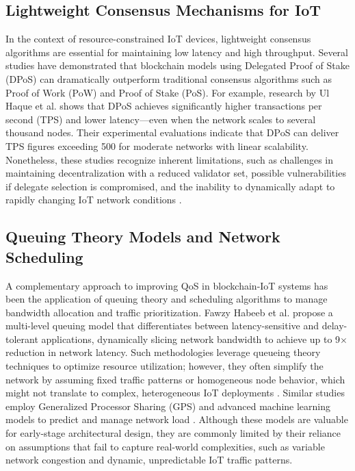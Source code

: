 \documentclass[12pt,onecolumn]{IEEEtran} %
\begin{document}
\subsection*{Lightweight Consensus Mechanisms for IoT}
In the context of resource-constrained IoT devices, lightweight consensus algorithms are essential for maintaining low latency and high throughput. Several studies have demonstrated that blockchain models using Delegated Proof of Stake (DPoS) can dramatically outperform traditional consensus algorithms such as Proof of Work (PoW) and Proof of Stake (PoS). For example, research by Ul Haque et al. \cite{haque2024ascalableblockchain} shows that DPoS achieves significantly higher transactions per second (TPS) and lower latency---even when the network scales to several thousand nodes. Their experimental evaluations indicate that DPoS can deliver TPS figures exceeding 500 for moderate networks with linear scalability. Nonetheless, these studies recognize inherent limitations, such as challenges in maintaining decentralization with a reduced validator set, possible vulnerabilities if delegate selection is compromised, and the inability to dynamically adapt to rapidly changing IoT network conditions \cite{haque2024ascalableblockchain}.

\subsection*{Queuing Theory Models and Network Scheduling}
A complementary approach to improving QoS in blockchain-IoT systems has been the application of queuing theory and scheduling algorithms to manage bandwidth allocation and traffic prioritization. Fawzy Habeeb et al. \cite{habeeb2022dynamicbandwidthslicing} propose a multi-level queuing model that differentiates between latency-sensitive and delay-tolerant applications, dynamically slicing network bandwidth to achieve up to 9$\times$ reduction in network latency. Such methodologies leverage queueing theory techniques to optimize resource utilization; however, they often simplify the network by assuming fixed traffic patterns or homogeneous node behavior, which might not translate to complex, heterogeneous IoT deployments \cite{habeeb2022dynamicbandwidthslicing}. Similar studies employ Generalized Processor Sharing (GPS) and advanced machine learning models to predict and manage network load \cite{zhang2024ondemandcentralizedresource}. Although these models are valuable for early-stage architectural design, they are commonly limited by their reliance on assumptions that fail to capture real-world complexities, such as variable network congestion and dynamic, unpredictable IoT traffic patterns.
\end{document}
